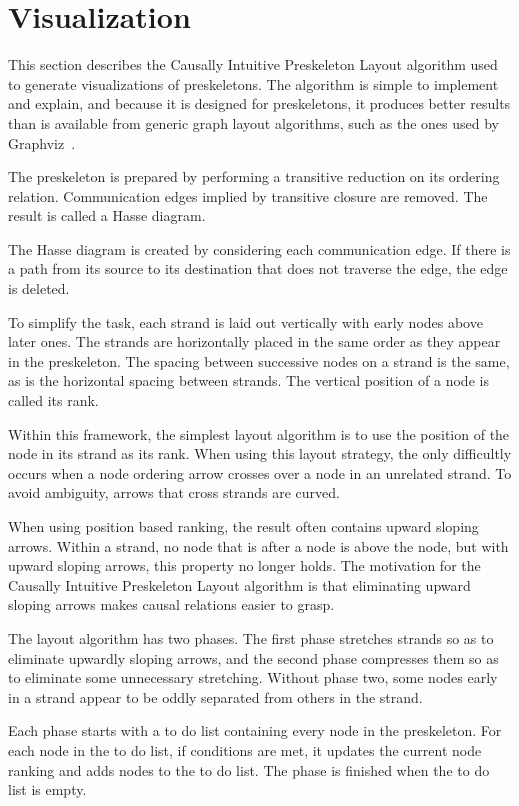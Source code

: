 \documentclass[12pt]{report}
\theoremstyle{definition}
\begin{document}
\chapter{Visualization}\label{cha:viz}

This section describes the Causally Intuitive Preskeleton Layout
algorithm used to generate visualizations of preskeletons.  The
algorithm is simple to implement and explain, and because it is
designed for preskeletons, it produces better results than is
available from generic graph layout algorithms, such as the ones used
by Graphviz~\cite{GansnerNorth00}.

The preskeleton is prepared by performing a transitive reduction on
its ordering relation.  Communication edges implied by transitive
closure are removed.  The result is called a Hasse diagram.

The Hasse diagram is created by considering each communication edge.
If there is a path from its source to its destination that does not
traverse the edge, the edge is deleted.

To simplify the task, each strand is laid out vertically with early
nodes above later ones.  The strands are horizontally placed in the
same order as they appear in the preskeleton.  The spacing between
successive nodes on a strand is the same, as is the horizontal spacing
between strands.  The vertical position of a node is called its rank.

Within this framework, the simplest layout algorithm is to use the
position of the node in its strand as its rank.  When using this
layout strategy, the only difficultly occurs when a node ordering
arrow crosses over a node in an unrelated strand.  To avoid ambiguity,
arrows that cross strands are curved.

When using position based ranking, the result often contains upward
sloping arrows.  Within a strand, no node that is after a node is
above the node, but with upward sloping arrows, this property no
longer holds.  The motivation for the Causally Intuitive Preskeleton
Layout algorithm is that eliminating upward sloping arrows makes
causal relations easier to grasp.

The layout algorithm has two phases.  The first phase stretches
strands so as to eliminate upwardly sloping arrows, and the second
phase compresses them so as to eliminate some unnecessary stretching.
Without phase two, some nodes early in a strand appear to be oddly
separated from others in the strand.

Each phase starts with a to do list containing every node in the
preskeleton.  For each node in the to do list, if conditions are met,
it updates the current node ranking and adds nodes to the to do list.
The phase is finished when the to do list is empty.
\end{document}
